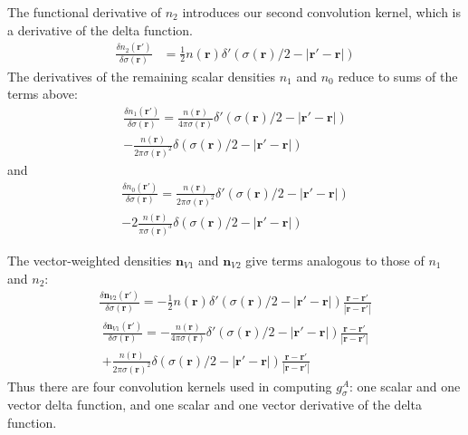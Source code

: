 \documentclass[letterpaper,amsmath,amssymb,10pt,pre]{revtex4-1}
\newcommand{\rr}{\textbf{r}}
\begin{document}
The functional derivative of $n_2$ introduces our second convolution
kernel, which is a derivative of the delta function.
\begin{align}
  \frac{\delta n_2(\rr')}{\delta \sigma(\rr)} &= \frac 12 n(\rr) \delta'(\sigma(\rr)/2 -\left|\rr' - \rr\right|)
\end{align}
The derivatives of the remaining scalar densities $n_1$ and $n_0$ reduce to
sums of the terms above:
\begin{multline}
  \frac{\delta n_1(\rr')}{\delta \sigma(\rr)}
  = \frac{n(\rr)}{4\pi
    \sigma(\rr)}\delta'(\sigma(\rr)/2 -\left|\rr' - \rr\right|) \\
  -
  \frac{n(\rr)}{2\pi
    \sigma(\rr)^2}\delta(\sigma(\rr)/2 -\left|\rr' - \rr\right|)
\end{multline}
and
\begin{multline}
  \frac{\delta n_0(\rr')}{\delta \sigma(\rr)}
  = \frac{n(\rr)}{2\pi
    \sigma(\rr)^2}\delta'(\sigma(\rr)/2 -\left|\rr' - \rr\right|)
  \\-
  2 \frac{n(\rr)}{\pi
    \sigma(\rr)^3}\delta(\sigma(\rr)/2 -\left|\rr' - \rr\right|)
\end{multline}

The vector-weighted densities $\mathbf{n}_{V1}$ and $\mathbf{n}_{V2}$
give terms analogous to those of $n_1$ and $n_2$:
\begin{multline}
  \frac{\delta \mathbf{n}_{V2}(\rr')}{\delta \sigma(\rr)} = -\frac 12 n(\rr) \delta'(\sigma(\rr)/2 -\left|\rr' - \rr\right|)
    \frac{\rr-\rr'}{|\rr-\rr'|}
\end{multline}
\begin{multline}
  \frac{\delta \mathbf{n}_{V1}(\rr')}{\delta \sigma(\rr)}
  = -\frac{n(\rr)}{4\pi
    \sigma(\rr)}\delta'(\sigma(\rr)/2 -\left|\rr' - \rr\right|) \frac{\rr-\rr'}{|\rr-\rr'|}
  \\ +
  \frac{n(\rr)}{2\pi
    \sigma(\rr)^2}\delta(\sigma(\rr)/2 -\left|\rr' - \rr\right|) \frac{\rr-\rr'}{|\rr-\rr'|}
\end{multline}
Thus there are four convolution kernels used in computing $g_\sigma^A$:
one scalar and one vector delta function, and one scalar and one
vector derivative of the delta function.

\end{document}
